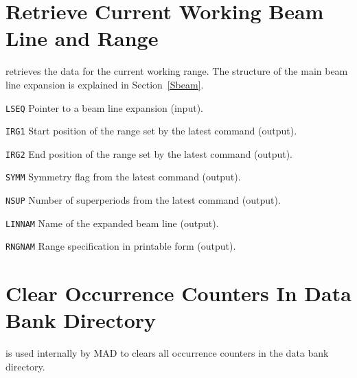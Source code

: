 \section{Retrieve Current Working Beam Line and Range}
\label{UTBEAM}
retrieves the data for the current working range.
The structure of the main beam line expansion is explained in
Section~\ref{Sbeam}.
\begin{mylist}
\item[\tt LSEQ]
Pointer to a beam line expansion (input).
\item[\tt IRG1]
Start position of the range set by the latest  command
(output). 
\item[\tt IRG2]
End position of the range set by the latest  command
(output). 
\item[\tt SYMM]
Symmetry flag from the latest  command (output).
\item[\tt NSUP]
Number of superperiods from the latest  command (output).
\item[\tt LINNAM]
Name of the expanded beam line (output).
\item[\tt RNGNAM]
Range specification in printable form (output).
\end{mylist}

\section{Clear Occurrence Counters In Data Bank Directory}
\label{UTCLRC}
is used internally by MAD to clears all occurrence counters in the
data bank directory.

